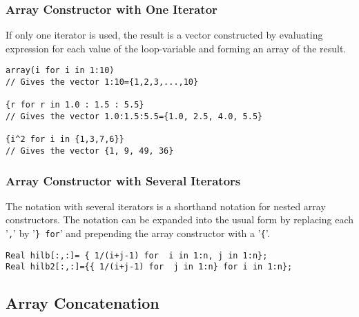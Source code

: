 \subsubsection{Array Constructor with One Iterator}\label{array-constructor-with-one-iterator}

If only one iterator is used, the result is a vector constructed by
evaluating expression for each value of the loop-variable and forming an
array of the result.

\begin{example}
\begin{lstlisting}[language=modelica]
array(i for i in 1:10)
// Gives the vector 1:10={1,2,3,...,10}

{r for r in 1.0 : 1.5 : 5.5}
// Gives the vector 1.0:1.5:5.5={1.0, 2.5, 4.0, 5.5}

{i^2 for i in {1,3,7,6}}
// Gives the vector {1, 9, 49, 36}
\end{lstlisting}
\end{example}

\subsubsection{Array Constructor with Several Iterators}\label{array-constructor-with-several-iterators}

The notation with several iterators is a shorthand notation for nested
array constructors. The notation can be expanded into the usual form by
replacing each '\lstinline!,!' by '\lstinline!} for!' and prepending the array constructor with
a '\lstinline!{!'.

\begin{example}
\begin{lstlisting}[language=modelica]
Real hilb[:,:]= { 1/(i+j-1) for  i in 1:n, j in 1:n};
Real hilb2[:,:]={{ 1/(i+j-1) for  j in 1:n} for i in 1:n};
\end{lstlisting}
\end{example}

\subsection{Array Concatenation}\label{array-concatenation}

